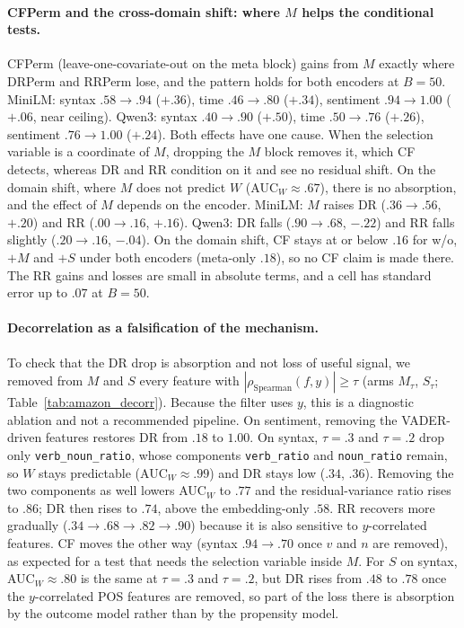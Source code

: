 \documentclass[11pt]{article}
\begin{document}
\paragraph{CFPerm and the cross-domain shift: where $M$ helps the conditional tests.}
CFPerm (leave-one-covariate-out on the meta block) gains from $M$ exactly where DRPerm and RRPerm lose,
and the pattern holds for both encoders at $B{=}50$.
MiniLM: syntax $.58\to.94$ ($+.36$), time $.46\to.80$ ($+.34$), sentiment $.94\to1.00$ ($+.06$, near ceiling).
Qwen3: syntax $.40\to.90$ ($+.50$), time $.50\to.76$ ($+.26$), sentiment $.76\to1.00$ ($+.24$).
Both effects have one cause.
When the selection variable is a coordinate of $M$, dropping the $M$ block removes it, which CF detects,
whereas DR and RR condition on it and see no residual shift.
On the domain shift, where $M$ does not predict $W$ (AUC$_W\approx.67$), there is no absorption, and the
effect of $M$ depends on the encoder.
MiniLM: $M$ raises DR ($.36\to.56$, $+.20$) and RR ($.00\to.16$, $+.16$).
Qwen3: DR falls ($.90\to.68$, $-.22$) and RR falls slightly ($.20\to.16$, $-.04$).
On the domain shift, CF stays at or below $.16$ for w/o, $+M$ and $+S$ under both encoders
(meta-only $.18$), so no CF claim is made there.
The RR gains and losses are small in absolute terms, and a cell has standard error up to $.07$ at $B{=}50$.

\paragraph{Decorrelation as a falsification of the mechanism.}
To check that the DR drop is absorption and not loss of useful signal, we removed from $M$ and $S$
every feature with $|\rho_{\mathrm{Spearman}}(f,y)|\ge\tau$ (arms $M_\tau$, $S_\tau$;
Table~\ref{tab:amazon_decorr}).
Because the filter uses $y$, this is a diagnostic ablation and not a recommended pipeline.
On sentiment, removing the VADER-driven features restores DR from $.18$ to $1.00$.
On syntax, $\tau=.3$ and $\tau=.2$ drop only \texttt{verb\_noun\_ratio}, whose components
\texttt{verb\_ratio} and \texttt{noun\_ratio} remain, so $W$ stays predictable (AUC$_W\approx.99$) and DR stays
low ($.34$, $.36$).
Removing the two components as well lowers AUC$_W$ to $.77$ and the residual-variance ratio rises to $.86$;
DR then rises to $.74$, above the embedding-only $.58$.
RR recovers more gradually ($.34\to.68\to.82\to.90$) because it is also sensitive to $y$-correlated features.
CF moves the other way (syntax $.94\to.70$ once $v$ and $n$ are removed), as expected for a test that needs
the selection variable inside $M$.
For $S$ on syntax, AUC$_W\approx.80$ is the same at $\tau=.3$ and $\tau=.2$, but DR rises from $.48$ to $.78$
once the $y$-correlated POS features are removed, so part of the loss there is absorption by the outcome
model rather than by the propensity model.
\end{document}
